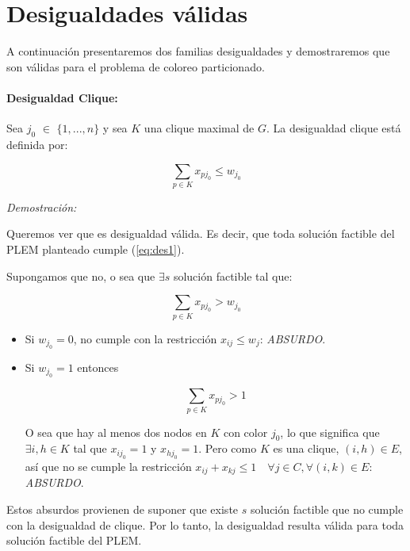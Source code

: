 \documentclass[a4paper]{article}
\begin{document}
\newpage

\section{Desigualdades válidas}

A continuación presentaremos dos familias desigualdades y demostraremos que son válidas para el problema de coloreo particionado.

\paragraph{Desigualdad Clique:} Sea $j_0$ $\in$ $ \{ 1,...,n \} $ y sea $K$ una clique maximal de $G$. La desigualdad clique está definida por:

\begin{equation} \label{eq:des1}
\sum_{p \in K} x_{pj_0} \leq w_{j_0}
\end{equation}

{\it Demostración:}

Queremos ver que es desigualdad válida.  Es decir, que toda solución factible del PLEM planteado cumple (\ref{eq:des1}).

Supongamos que no, o sea que $\exists s$ solución factible tal que:

\begin{equation*}
\sum_{p \in K} x_{pj_0} > w_{j_0}
\end{equation*}

\begin{itemize}
	\item Si $w_{j_0} = 0$, no cumple con la restricción $x_{ij} \leq w_j$: {\it ABSURDO}.
	
	\item Si $w_{j_0} = 1$ entonces
	
	\begin{equation*}
	\sum_{p \in K} x_{pj_0} > 1
	\end{equation*}

	O sea que hay al menos dos nodos en $K$ con color $j_0$, lo que significa que $\exists i,h \in K$ tal que $x_{ij_0} = 1$ y $x_{hj_0} =1$.  Pero como $K$ es una clique, $(i,h) \in E$, así que no se cumple la restricción $x_{ij} + x_{kj} \leq 1 \quad \forall j \in C,\forall (i,k) \in E$: {\it ABSURDO}.
\end{itemize}

Estos absurdos provienen de suponer que existe $s$ solución factible que no cumple con la desigualdad de clique.  Por lo tanto, la desigualdad resulta válida para toda solución factible del PLEM.
\end{document}
